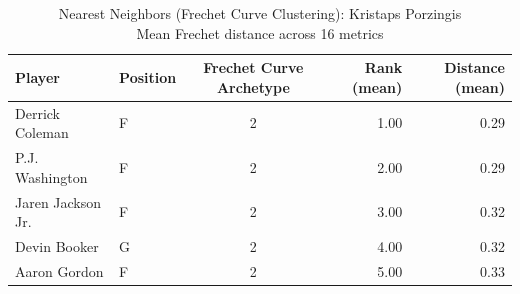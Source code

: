 \begin{table}[t]
\caption*{
{\fontsize{20}{25} Nearest Neighbors (Frechet Curve Clustering): Kristaps Porzingis\fontsize{12}{15}\selectfont } \\ 
{\fontsize{14}{17}\selectfont  Mean Frechet distance across 16 metrics\fontsize{12}{15}\selectfont }
} 
\fontsize{12.0pt}{14.0pt}\selectfont
\begin{tabular*}{\linewidth}{@{\extracolsep{\fill}}llcrr}
\toprule
Player & Position & Frechet Curve Archetype & Rank (mean) & Distance (mean) \\ 
\midrule\addlinespace[2.5pt]
Derrick Coleman & F & 2 & 1.00 & 0.29 \\ 
P.J. Washington & F & 2 & 2.00 & 0.29 \\ 
Jaren Jackson Jr. & F & 2 & 3.00 & 0.32 \\ 
Devin Booker & G & 2 & 4.00 & 0.32 \\ 
Aaron Gordon & F & 2 & 5.00 & 0.33 \\ 
\bottomrule
\end{tabular*}
\end{table}


